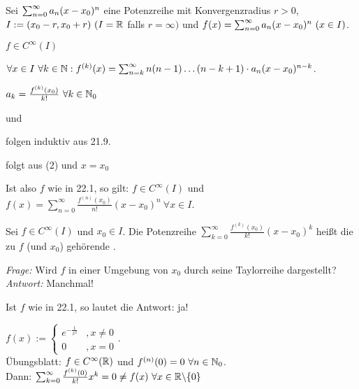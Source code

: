 \documentclass[a4paper,twoside,DIV15,BCOR12mm]{scrbook}
\begin{document}
\begin{satz}
Sei $\sum_{n=0}^{\infty}{a_n(x-x_0)^n}$ eine Potenzreihe mit Konvergenzradius $r>0$, $I:= (x_0-r,x_0+r)\ (I=\mathbb{R}$ falls $r=\infty)$ und $f(x) = \sum_{n=0}^{\infty}{a_n(x-x_0)^n}\ (x\in I)$.
\begin{liste}
\item $f\in C^\infty(I)$
\item $\forall x \in I\ \forall k\in\mathbb{N}: f^{(k)}(x) = \sum_{n=k}^\infty n(n-1)\ldots(n-k+1)\cdot a_n(x-x_0)^{n-k}$.
\item $a_k = \frac{f^{(k)}(x_0)}{k!} \ \forall k \in \mathbb{N}_0$
\end{liste}
\end{satz}

\begin{beweise}
\item und
\item folgen induktiv aus 21.9.
\item folgt aus (2) und $x=x_0$
\end{beweise}

\begin{motivation}
Ist also $f$ wie in 22.1, so gilt: $f\in C^\infty(I)$ und $f(x)=\sum_{n=0}^\infty \frac{f^{(n)}(x_0)}{n!}(x-x_0)^n \ \forall x \in I$.
\end{motivation}

\begin{definition}
Sei $f\in C^\infty(I)$ und $x_0 \in I$. Die Potenzreihe $\sum_{k=0}^\infty \frac{f^{(k)}(x_0)}{k!}(x-x_0)^k$ heißt die zu $f$ (und $x_0$) gehörende .
\end{definition}

\begin{motivation}
\emph{Frage:} Wird $f$ in einer Umgebung von $x_0$ durch seine Taylorreihe dargestellt? \\
\emph{Antwort:} Manchmal!
\end{motivation}

\begin{beispiele}
\item Ist $f$ wie in 22.1, so lautet die Antwort: ja!
\item $f(x):= \begin{cases} e^{-\frac{1}{x^2}} &, x\ne0 \\ 0 &, x= 0\end{cases}$. \\
Übungsblatt: $f \in C^\infty(\mathbb{R})$ und $f^{(n)}(0)=0\ \forall n\in\mathbb{N}_0$. \\
Dann: $\sum_{k=0}^\infty \frac{f^{(k)}(0)}{k!}x^k = 0 \ne f(x) \ \forall x\in\mathbb{R}\backslash\{0\}$
\end{beispiele}
\end{document}
